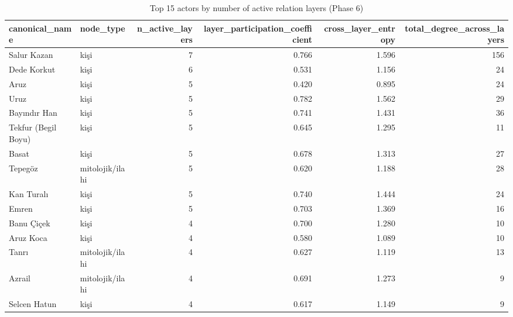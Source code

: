 \begin{table}
\caption{Top 15 actors by number of active relation layers (Phase 6)}
\label{tab:t06_layer_specific_metrics}
\begin{tabular}{llrrrr}
\toprule
canonical_name & node_type & n_active_layers & layer_participation_coefficient & cross_layer_entropy & total_degree_across_layers \\
\midrule
Salur Kazan & kişi & 7 & 0.766 & 1.596 & 156 \\
Dede Korkut & kişi & 6 & 0.531 & 1.156 & 24 \\
Aruz & kişi & 5 & 0.420 & 0.895 & 24 \\
Uruz & kişi & 5 & 0.782 & 1.562 & 29 \\
Bayındır Han & kişi & 5 & 0.741 & 1.431 & 36 \\
Tekfur (Begil Boyu) & kişi & 5 & 0.645 & 1.295 & 11 \\
Basat & kişi & 5 & 0.678 & 1.313 & 27 \\
Tepegöz & mitolojik/ilahi & 5 & 0.620 & 1.188 & 28 \\
Kan Turalı & kişi & 5 & 0.740 & 1.444 & 24 \\
Emren & kişi & 5 & 0.703 & 1.369 & 16 \\
Banu Çiçek & kişi & 4 & 0.700 & 1.280 & 10 \\
Aruz Koca & kişi & 4 & 0.580 & 1.089 & 10 \\
Tanrı & mitolojik/ilahi & 4 & 0.627 & 1.119 & 13 \\
Azrail & mitolojik/ilahi & 4 & 0.691 & 1.273 & 9 \\
Selcen Hatun & kişi & 4 & 0.617 & 1.149 & 9 \\
\bottomrule
\end{tabular}
\end{table}
